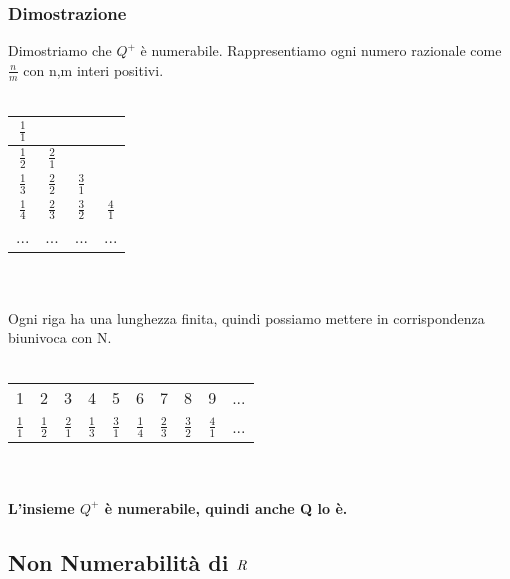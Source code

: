 \documentclass[11pt, a4paper]{article}
\begin{document}
\subsubsection*{Dimostrazione}
Dimostriamo che $ Q^+$ è numerabile. Rappresentiamo ogni numero razionale come $\frac{n}{m}$ con n,m interi positivi.\	
\\
\\
\begin{tabular}{|c|c|c|c|}
\hline
\rule [-0,3cm]{0mm}{0,7cm}
$\frac{1}{1}$ & & & \\
\hline
\rule [-0,3cm]{0mm}{0,7cm}
$\frac{1}{2}$ & $\frac{2}{1}$ & &\\
\hline
\rule [-0,3cm]{0mm}{0,7cm}
$\frac{1}{3}$ & $\frac{2}{2}$ & $\frac{3}{1}$ &\\
\hline
\rule [-0,3cm]{0mm}{0,7cm}
$\frac{1}{4}$ & $\frac{2}{3}$ & $\frac{3}{2}$ & $\frac{4}{1}$\\
\hline
... & ... & ... & ...\\
\hline
\end{tabular}
\\
\\
Ogni riga ha una lunghezza finita, quindi possiamo mettere in corrispondenza biunivoca con N.
\\
\\
\begin{tabular}{lcrlcrlcrl}
1 & 2 & 3 & 4 & 5 & 6 & 7 & 8 & 9 & ...\\
$\frac{1}{1}$ & $\frac{1}{2}$ & $\frac{2}{1}$ & $\frac{1}{3}$ & $\frac{3}{1}$ & $\frac{1}{4}$ & $\frac{2}{3}$ & $\frac{3}{2}$ & $\frac{4}{1}$ & ...
\end{tabular}
\\
\\
\textbf{L'insieme $Q^+$ è numerabile, quindi anche Q lo è.}

\subsection{Non Numerabilità di $\emph{R}$}
\end{document}
